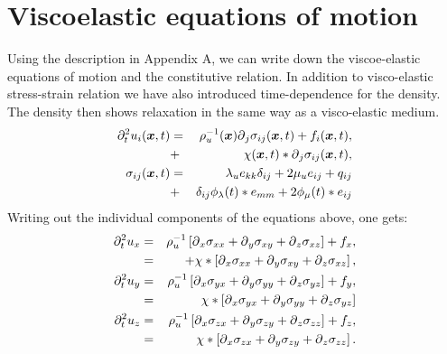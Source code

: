 \documentclass[11pt]{article}
\begin{document}
\section*{Viscoelastic equations of motion} 
Using the description in Appendix A, we can write down the viscoe-elastic equations
of motion and the constitutive relation.
In addition to visco-elastic stress-strain relation we have also
introduced time-dependence for the density.
The density then shows relaxation in the same way as a visco-elastic medium.
\begin{eqnarray}
  \partial^2_t{u_i(\mbox{\boldmath $x$}, t)} & = & \rho^{-1}_u(\mbox{\boldmath $x$})\mbox{$\partial$}_j \sigma_{ij}(\mbox{\boldmath $x$}, t) 
                                               +f_i(\mbox{\boldmath $x$},t),     \nonumber\\
                    & + & \chi(\mbox{\boldmath $x$},t)*\mbox{$\partial$}_j \sigma_{ij}(\mbox{\boldmath $x$}, t), \\
					   \label{eq:iso-ve-eqm}
  \sigma_{ij}(\mbox{\boldmath $x$}, t) & = & 
                            \lambda_u e_{kk}\delta_{ij} + 2\mu_u e_{ij} 
                                               +q_{ij}          \nonumber\\
                      & + & \delta_{ij}\phi_{\lambda}(t)*e_{mm} 
                                         +2\phi_{\mu}(t)*e_{ij}
					  \label{eq:iso-ve-cse}
\end{eqnarray}
Writing out the individual components of the equations above, one gets:
%
\begin{eqnarray}
  \partial^2_t{u}_x & = & \rho^{-1}_u\left[\mbox{$\partial$}_x \sigma_{xx} +\mbox{$\partial$}_y \sigma_{xy} 
                                 +\mbox{$\partial$}_z \sigma_{xz}\right] + f_x,  \nonumber \\
            & = & + \chi*\left[\mbox{$\partial$}_x \sigma_{xx} +\mbox{$\partial$}_y \sigma_{xy} 
                                 +\mbox{$\partial$}_z \sigma_{xz}\right],        \nonumber \\
  \partial^2_t{u}_y & = & \rho^{-1}_u\left[\mbox{$\partial$}_x \sigma_{yx} +\mbox{$\partial$}_y \sigma_{yy} 
                                 +\mbox{$\partial$}_z \sigma_{yz}\right] + f_y, \nonumber  \\
            & = & \chi*\left[\mbox{$\partial$}_x \sigma_{yx} +\mbox{$\partial$}_y \sigma_{yy} 
                                 +\mbox{$\partial$}_z \sigma_{yz}\right] \nonumber         \\
  \partial^2_t{u}_z & = & \rho^{-1}_u\left[\mbox{$\partial$}_x \sigma_{zx} +\mbox{$\partial$}_y \sigma_{zy} 
                                 +\mbox{$\partial$}_z \sigma_{zz}\right] + f_z, \nonumber  \\
            & = & \chi*\left[\mbox{$\partial$}_x \sigma_{zx} +\mbox{$\partial$}_y \sigma_{zy} 
                                 +\mbox{$\partial$}_z \sigma_{zz}\right].         \nonumber\\
\end{eqnarray}
\end{document}
